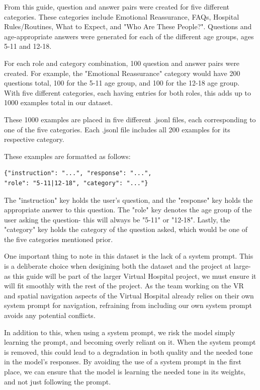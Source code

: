\documentclass[journal]{IEEEtai}
\begin{document}
From this guide, question and answer pairs were created for five different categories. These categories include Emotional Reassurance, FAQs, Hospital Rules/Routines, What to Expect, and "Who Are These People?". Questions and age-appropriate answers were generated for each of the different age groups, ages 5-11 and 12-18.

For each role and category combination, 100 question and answer pairs were created. For example, the "Emotional Reassurance" category would have 200 questions total, 100 for the 5-11 age group, and 100 for the 12-18 age group. With five different categories, each having entries for both roles, this adds up to 1000 examples total in our dataset.

These 1000 examples are placed in five different .jsonl files, each corresponding to one of the five categories. Each .jsonl file includes all 200 examples for its respective category.

These examples are formatted as follows:

\begin{verbatim}
{"instruction": "...", "response": "...",
"role": "5-11|12-18", "category": "..."}
\end{verbatim}

The "instruction" key holds the user's question, and the "response" key holds the appropriate answer to this question. The "role" key denotes the age group of the user asking the question- this will always be "5-11" or "12-18". Lastly, the "category" key holds the category of the question asked, which would be one of the five categories mentioned prior.

One important thing to note in this dataset is the lack of a system prompt. This is a deliberate choice when desigining both the dataset and the project at large- as this guide will be part of the larger Virtual Hospital project, we must ensure it will fit smoothly with the rest of the project. As the team working on the VR and spatial navigation aspects of the Virtual Hospital already relies on their own system prompt for navigation, refraining from including our own system prompt avoids any potential conflicts.

In addition to this, when using a system prompt, we risk the model simply learning the prompt, and becoming overly reliant on it. When the system prompt is removed, this could lead to a degradation in both quality and the needed tone in the model's responses. By avoiding the use of a system prompt in the first place, we can ensure that the model is learning the needed tone in its weights, and not just following the prompt.
\end{document}
